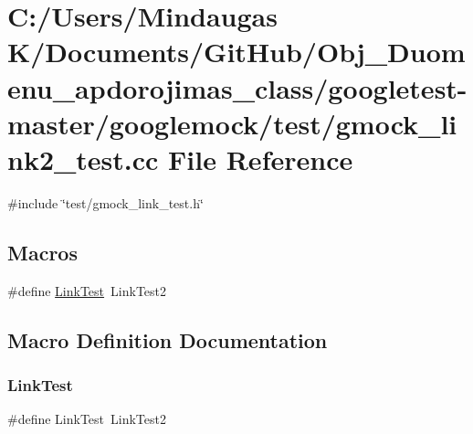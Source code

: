 \hypertarget{googletest-master_2googlemock_2test_2gmock__link2__test_8cc}{}\section{C\+:/\+Users/\+Mindaugas K/\+Documents/\+Git\+Hub/\+Obj\+\_\+\+Duomenu\+\_\+apdorojimas\+\_\+class/googletest-\/master/googlemock/test/gmock\+\_\+link2\+\_\+test.cc File Reference}
\label{googletest-master_2googlemock_2test_2gmock__link2__test_8cc}
{\ttfamily \#include \char`\"{}test/gmock\+\_\+link\+\_\+test.\+h\char`\"{}}\newline
\subsection*{Macros}
\begin{DoxyCompactItemize}
\item 
\#define \mbox{\hyperlink{googletest-master_2googlemock_2test_2gmock__link2__test_8cc_afb3d3e7fd53242710a55460595d750bb}{Link\+Test}}~Link\+Test2
\end{DoxyCompactItemize}


\subsection{Macro Definition Documentation}
\mbox{\label{googletest-master_2googlemock_2test_2gmock__link2__test_8cc_afb3d3e7fd53242710a55460595d750bb}} 
\subsubsection{\texorpdfstring{LinkTest}{LinkTest}}
{\footnotesize\ttfamily \#define Link\+Test~Link\+Test2}

